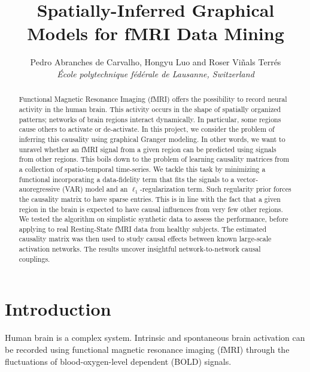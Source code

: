 \documentclass[10pt,conference,compsocconf]{IEEEtran}
\begin{document}
\title{Spatially-Inferred Graphical Models for fMRI Data Mining}

\author{
  Pedro Abranches de Carvalho, Hongyu Luo and Roser Vi\~nals Terr\'es\\
  \textit{\'Ecole polytechnique f\'ed\'erale de Lausanne, Switzerland}

}

\maketitle

\begin{abstract}

Functional Magnetic Resonance Imaging (fMRI) offers the possibility to record neural activity in the human brain. This activity occurs in the shape of spatially organized patterns; networks of brain regions interact dynamically. In particular, some regions cause others to activate or de-activate. In this project, we consider the problem of inferring this causality using graphical Granger modeling. In other words, we want to unravel whether an fMRI signal from a given region can be predicted using signals from other regions. This boils down to the problem of learning causality matrices from a collection of spatio-temporal time-series. We tackle this task by minimizing a functional incorporating a data-fidelity term that fits the signals to a vector-auoregressive (VAR)  model and an $\ell_1$-regularization term. Such regularity prior forces the causality matrix to have sparse entries. This is in line with the fact that a given region in the brain is expected to have causal influences from very few other regions. We tested the algorithm on simplistic synthetic data to assess the performance, before applying to real Resting-State fMRI data from healthy subjects. The estimated causality matrix was then used to study causal effects between known large-scale activation networks. The results uncover insightful network-to-network causal couplings. 


\end{abstract}

\section{Introduction}
Human brain is a complex system. Intrinsic and spontaneous brain activation can be recorded using functional magnetic resonance imaging (fMRI) through the fluctuations of blood-oxygen-level dependent (BOLD) signals. 
\end{document}
